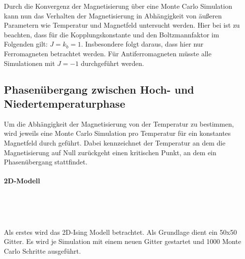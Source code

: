 
Durch die Konvergenz der Magnetisierung über eine Monte Carlo Simulation kann nun das Verhalten der Magnetisierung in Abhängigkeit von äußeren Parametern wie Temperatur und Magnetfeld untersucht werden. Hier bei ist zu beachten, dass für die Kopplungskonstante und den Boltzmannfaktor im Folgenden gilt: $J=k_{b}=1$. Insbesondere folgt daraus, dass hier nur Ferromagneten betrachtet werden. Für Antiferromagneten müsste alle Simulationen mit $J=-1$ durchgeführt werden.


\subsection{Phasenübergang zwischen Hoch- und Niedertemperaturphase}
\label{auswT}

Um die Abhängigkeit der Magnetisierung von der Temperatur zu bestimmen, wird jeweils eine Monte Carlo Simulation pro Temperatur für ein konstantes Magnetfeld durch geführt. Dabei kennzeichnet der Temperatur an dem die Magnetisierung auf Null zurückgeht einen kritischen Punkt, an dem ein Phasenübergang stattfindet.


\paragraph{2D-Modell}

\

\

Als erstes wird das 2D-Ising Modell betrachtet. Als Grundlage dient ein 50x50 Gitter. Es wird je Simulation mit einem neuen Gitter gestartet und 1000 Monte Carlo Schritte ausgeführt. 


